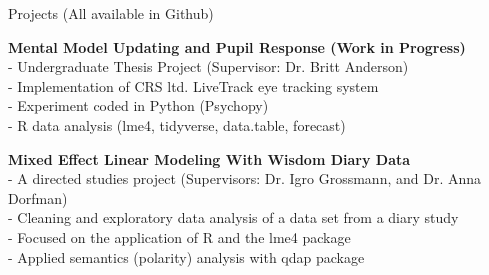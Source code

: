 \documentclass{resume} %
\begin{document}
\begin{rSection}{Projects (All available in Github)}

{\bf Mental Model Updating and Pupil Response (Work in Progress)}
\\- Undergraduate Thesis Project (Supervisor: Dr. Britt Anderson)
\\- Implementation of CRS ltd. LiveTrack eye tracking system
\\- Experiment coded in Python (Psychopy)
\\- R data analysis (lme4, tidyverse, data.table, forecast)

{\bf Mixed Effect Linear Modeling With Wisdom Diary Data}
\\- A directed studies project (Supervisors: Dr. Igro Grossmann, and Dr. Anna Dorfman)
\\- Cleaning and exploratory data analysis of a data set from a diary study
\\- Focused on the application of R and the lme4 package
\\- Applied semantics (polarity) analysis with qdap package


\end{rSection}
\end{document}
